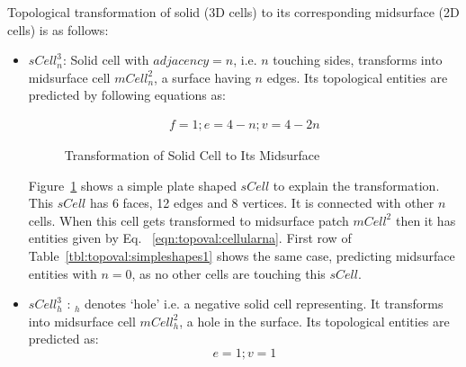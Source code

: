 Topological transformation of solid (3D cells) to its corresponding midsurface (2D cells) is as follows:

\begin{itemize}
[noitemsep,topsep=2pt,parsep=2pt,partopsep=2pt]

	\item  $sCell^{3}_{n}$: Solid cell with $adjacency = n$, i.e. $n$ touching sides, transforms into midsurface cell $mCell^2_{n}$, a surface having $n$ edges. Its topological entities are predicted by following equations as:
	
\begin{align}
f=1;
e=4-n;
v=4-2n
\label{eqn:topoval:cellularna}
\end{align} 


	\begin{figure}[!h]
	\centering     %
	 \qquad
	\caption{Transformation of Solid Cell to Its Midsurface }
	\label{fig:topoval:s3m2}
	\end{figure}
	
Figure~\ref{fig:topoval:s3m2} shows a simple plate shaped $sCell$ to explain the transformation. This $sCell$ has 6 faces, 12 edges and 8 vertices. It is connected with other $n$ cells. When this cell gets transformed to midsurface patch $mCell^2$ then it has entities given by Eq. ~\ref{eqn:topoval:cellularna}. First row of Table~\ref{tbl:topoval:simpleshapes1} shows the same case, predicting midsurface entities with $n=0$, as no other cells are touching this $sCell$.

	\item   $sCell^{3}_{h}$ : $_h$ denotes `hole' i.e. a negative solid cell representing. It transforms into midsurface cell  $mCell^{2}_{h}$, a hole in the surface. Its topological entities are predicted as:
\begin{equation}
e=1; v=1
\label{eqn:topoval:cellularah}
\end{equation} 


\end{itemize}
